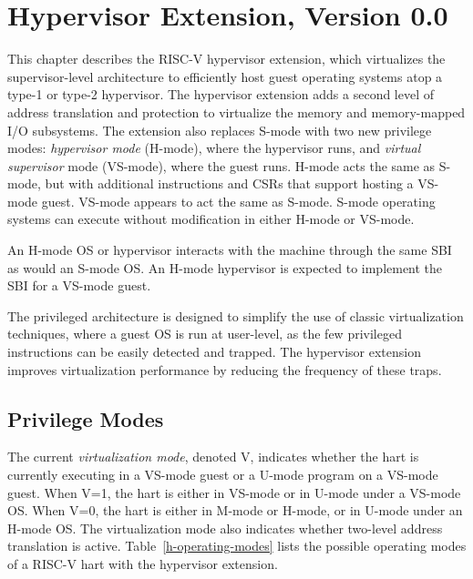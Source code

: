 \chapter{Hypervisor Extension, Version 0.0}
\label{hypervisor}

This chapter describes the RISC-V hypervisor extension, which virtualizes
the supervisor-level architecture to efficiently host guest operating
systems atop a type-1 or type-2 hypervisor.  The hypervisor extension adds
a second level of address translation and protection to virtualize the
memory and memory-mapped I/O subsystems.  The extension also replaces
S-mode with two new privilege modes: {\em hypervisor mode} (H-mode), where
the hypervisor runs, and {\em virtual supervisor} mode (VS-mode), where the
guest runs.  H-mode acts the same as S-mode, but with additional
instructions and CSRs that support hosting a VS-mode guest.  VS-mode
appears to act the same as S-mode.  S-mode operating systems can execute
without modification in either H-mode or VS-mode.

An H-mode OS or hypervisor interacts with the machine through the same SBI
as would an S-mode OS.  An H-mode hypervisor is expected to implement the
SBI for a VS-mode guest.

\begin{commentary}
The privileged architecture is designed to simplify the use of classic
virtualization techniques, where a guest OS is run at user-level, as
the few privileged instructions can be easily detected and trapped.
The hypervisor extension improves virtualization performance by
reducing the frequency of these traps.
\end{commentary}

\section{Privilege Modes}

The current {\em virtualization mode}, denoted V, indicates whether
the hart is currently executing in
a VS-mode guest or a U-mode program on a VS-mode guest.
When V=1, the hart is either in VS-mode or in U-mode under a VS-mode OS.
When V=0, the hart is either in M-mode or H-mode, or in U-mode under an
H-mode OS.  The virtualization mode also indicates whether two-level
address translation is active.  Table~\ref{h-operating-modes} lists the
possible operating modes of a RISC-V hart with the hypervisor extension.


